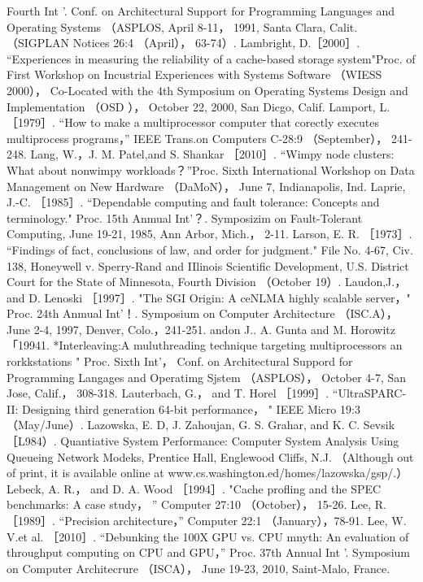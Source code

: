 Fourth Int '. Conf. on Architectural Support for Programming Languages and Operating Systems （ASPLOS, April 8-11，
1991, Santa Clara, Calit. （SIGPLAN Notices 26:4 （April）， 63-74）.
Lambright, D.［2000］. “Experiences in measuring the reliability of a cache-based storage system"Proc. of First Workshop on
Incustrial Experiences with Systems Software （WIESS 2000）， Co-Located with the 4th Symposium on Operating Systems
Design and Implementation （OSD ）， October 22, 2000, San Dicgo, Calif.
Lamport, L. ［1979］. “How to make a multiprocessor computer that corectly executes multiprocess programs，” IEEE Trans.on
Computers C-28:9 （September）， 241-248.
Lang, W.，J. M. Patel,and S. Shankar ［2010］. “Wimpy node clusters: What about nonwimpy workloads？”Proc. Sixth
International Workshop on Data Management on New Hardware （DaMoN）， June 7, Indianapolis, Ind.
Laprie, J.-C. ［1985］. “Dependable computing and fault tolerance: Concepts and terminology." Proc. 15th Anmual Int'？.
Symposizim on Fault-Tolerant Computing, June 19-21, 1985, Ann Arbor, Mich.， 2-11.
Larson, E. R. ［1973］. “Findings of fact, conclusions of law, and order for judgment." File No. 4-67, Civ. 138, Honeywell v.
Sperry-Rand and IIlinois Scientific Development, U.S. District Court for the State of Minnesota, Fourth Division （October 19）.
Laudon,J.， and D. Lenoski ［1997］. "The SGI Origin: A ceNLMA highly scalable server，" Proc. 24th Anmual Int'！. Symposium on
Computer Architecture （ISC.A）， June 2-4, 1997, Denver, Colo.，241-251.
andon J.. A. Gunta and M. Horowitz「19941. *Interleaving:A muluthreading technique targeting multiprocessors an
rorkkstations " Proc. Sixth Int'， Conf. on Architectural Suppord for Programming Langages and Operatimg Sjstem
（ASPLOS）， October 4-7, San Jose, Calif.， 308-318.
Lauterbach, G.， and T. Horel ［1999］. “UltraSPARC-II: Designing third generation 64-bit performance， " IEEE Micro 19:3
（May/June）.
Lazowska, E. D, J. Zahoujan, G. S. Grahar, and K. C. Sevsik ［L984）. Quantiative System Performance: Computer System
Analysis Using Queueing Network Modeks, Prentice Hall, Englewood Cliffs, N.J. （Although out of print, it is available online
at www.cs.washington.ed/homes/lazowska/gsp/.）
Lebeck, A. R.， and D. A. Wood ［1994］. "Cache profling and the SPEC benchmarks: A case study， ” Computer 27:10 （October）， 15-26.
Lee, R. ［1989］. “Precision architecture，” Computer 22:1 （January），78-91.
Lee, W. V.et al. ［2010］. “Debunking the 100X GPU vs. CPU mnyth: An evaluation of throughput computing on CPU and GPU，”
Proc. 37th Annual Int '. Symposium on Computer Architecrure （ISCA）， June 19-23, 2010, Saint-Malo, France.
